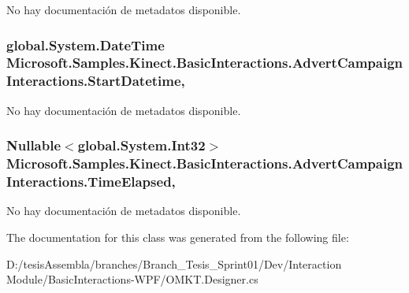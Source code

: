 No hay documentación de metadatos disponible. 

\hypertarget{class_microsoft_1_1_samples_1_1_kinect_1_1_basic_interactions_1_1_advert_campaign_interactions_aa32fcb1d41749aa3624c589cf45e639f}{
\subsubsection[{Start\-Datetime}]{\setlength{\rightskip}{0pt plus 5cm}global.\-System.\-Date\-Time Microsoft.\-Samples.\-Kinect.\-Basic\-Interactions.\-Advert\-Campaign\-Interactions.\-Start\-Datetime\hspace{0.3cm}{\ttfamily [get]}, {\ttfamily [set]}}}\label{class_microsoft_1_1_samples_1_1_kinect_1_1_basic_interactions_1_1_advert_campaign_interactions_aa32fcb1d41749aa3624c589cf45e639f}


No hay documentación de metadatos disponible. 

\hypertarget{class_microsoft_1_1_samples_1_1_kinect_1_1_basic_interactions_1_1_advert_campaign_interactions_ac4f4469d85fc6292cd781529767ad7ab}{
\subsubsection[{Time\-Elapsed}]{\setlength{\rightskip}{0pt plus 5cm}Nullable$<$global.\-System.\-Int32$>$ Microsoft.\-Samples.\-Kinect.\-Basic\-Interactions.\-Advert\-Campaign\-Interactions.\-Time\-Elapsed\hspace{0.3cm}{\ttfamily [get]}, {\ttfamily [set]}}}\label{class_microsoft_1_1_samples_1_1_kinect_1_1_basic_interactions_1_1_advert_campaign_interactions_ac4f4469d85fc6292cd781529767ad7ab}


No hay documentación de metadatos disponible. 



The documentation for this class was generated from the following file\-:\begin{DoxyCompactItemize}
\item 
D\-:/tesis\-Assembla/branches/\-Branch\-\_\-\-Tesis\-\_\-\-Sprint01/\-Dev/\-Interaction Module/\-Basic\-Interactions-\/\-W\-P\-F/O\-M\-K\-T.\-Designer.\-cs\end{DoxyCompactItemize}
